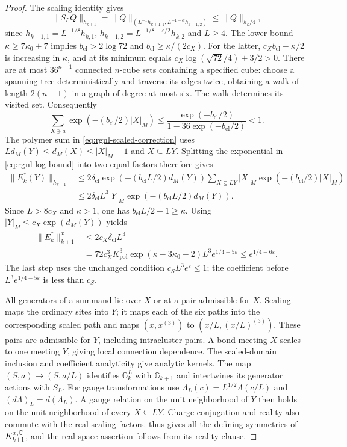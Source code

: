 \begin{proof}
The scaling identity gives
\[
 \|S_LQ\|_{h_{k+1}}
   =\|Q\|_{(L^{-1}h_{k+1,1},L^{-1-\alpha}h_{k+1,2})}
   \le\|Q\|_{h_k/4},
\]
since $h_{k+1,1}=L^{-1/8}h_{k,1}$,
$h_{k+1,2}=L^{-1/8+\varepsilon/2}h_{k,2}$ and $L\ge4$.
The lower bound $\kappa\ge7\kappa_0+7$ implies
$b_{\mathrm{cl}}>2\log72$ and
$b_{\mathrm{cl}}\ge\kappa/(2c_X)$.
For the latter, $c_Xb_{\mathrm{cl}}-\kappa/2$ is increasing
in $\kappa$, and at its minimum equals
$c_X\log(\sqrt{72}/4)+3/2>0$.
There are at most $36^{n-1}$ connected $n$-cube sets containing
a specified cube: choose a spanning tree deterministically and
traverse its edges twice, obtaining a walk of length $2(n-1)$
in a graph of degree at most six. The walk determines its visited set.
Consequently
\[
 \sum_{X\ni a}\exp(-(b_{\mathrm{cl}}/2)|X|_M)
 \le\frac{\exp(-b_{\mathrm{cl}}/2)}
                 {1-36\exp(-b_{\mathrm{cl}}/2)}<1.
\]
The polymer sum in \eqref{eq:rgnl-scaled-correction}
uses $Ld_M(Y)\le d_M(X)\le|X|_M-1$ and $X\subseteq LY$.
Splitting the exponential in \eqref{eq:rgnl-log-bound} into
two equal factors therefore gives
\begin{align*}
 \|E_k^*(Y)\|_{h_{k+1}}
 &\le2\delta_{\mathrm{cl}}\exp(-(b_{\mathrm{cl}}L/2)d_M(Y))
                    \sum_{X\subseteq LY}|X|_M
                                    \exp(-(b_{\mathrm{cl}}/2)|X|_M)\\
 &\le2\delta_{\mathrm{cl}}L^3|Y|_M
                                    \exp(-(b_{\mathrm{cl}}L/2)d_M(Y)).
\end{align*}
Since $L>8c_X$ and $\kappa>1$, one has
$b_{\mathrm{cl}}L/2-1\ge\kappa$.
Using $|Y|_M\le c_X\exp(d_M(Y))$ yields
\begin{align*}
 \|E_k^*\|_{k+1}^x
 &\le2c_X\delta_{\mathrm{cl}}L^3\\
 &=72c_X^3K_{\mathrm{pol}}^3\exp(\kappa-3\kappa_0-2)
                                    L^3e^{1/4-5\varepsilon}
 \le e^{1/4-6\varepsilon}.
\end{align*}
The last step uses the unchanged condition $c_SL^3e^\varepsilon\le1$;
the coefficient before $L^3e^{1/4-5\varepsilon}$ is less than $c_S$.

All generators of a summand lie over $X$ or at a pair
admissible for $X$. Scaling maps the ordinary sites
into $Y$; it maps each of the six paths into the
corresponding scaled path and maps
$(x,x^{(3)})$ to $(x/L,(x/L)^{(3)})$.
These pairs are admissible for $Y$, including
intracluster pairs. A bond meeting $X$ scales to
one meeting $Y$, giving local connection dependence.
The scaled-domain inclusion and coefficient analyticity
give analytic kernels.
The map $(S,a)\mapsto(S,a/L)$ identifies
$\mathbb G_k^L$ with $\mathbb G_{k+1}$ and intertwines
its generator actions with $S_L$. For gauge transformations
use $\Lambda_L(c)=L^{1/2}\Lambda(c/L)$ and
$(d\Lambda)_L=d(\Lambda_L)$.
A gauge relation on the unit neighborhood of $Y$
then holds on the unit neighborhood of every
$X\subseteq LY$. Charge conjugation and reality also
commute with the real scaling factors.
 thus gives all the
defining symmetries of $K_{k+1}^{x,\mathbb C}$, and the real
space assertion follows from its reality clause.


\end{proof}
